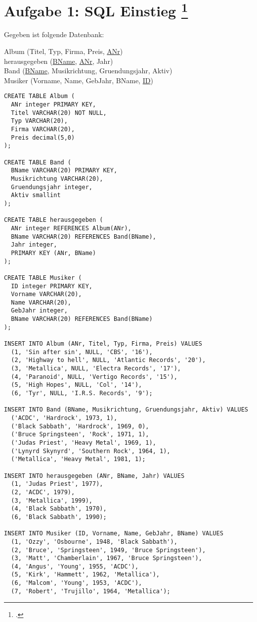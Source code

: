 \documentclass{bschlangaul-aufgabe}
\begin{document}

\section{Aufgabe 1: SQL Einstieg
\footcite{db:pu:2}}

Gegeben ist folgende Datenbank: \bigskip

{
\ttfamily
\noindent
Album (Titel, Typ, Firma, Preis, \underline{ANr})\\
\noindent
herausgegeben (\underline{BName}, \underline{ANr}, Jahr)\\
\noindent
Band (\underline{BName}, Musikrichtung, Gruendungsjahr, Aktiv)\\
\noindent
Musiker (Vorname, Name, GebJahr, BName, \underline{ID})\\
}

\begin{verbatim}
CREATE TABLE Album (
  ANr integer PRIMARY KEY,
  Titel VARCHAR(20) NOT NULL,
  Typ VARCHAR(20),
  Firma VARCHAR(20),
  Preis decimal(5,0)
);

CREATE TABLE Band (
  BName VARCHAR(20) PRIMARY KEY,
  Musikrichtung VARCHAR(20),
  Gruendungsjahr integer,
  Aktiv smallint
);

CREATE TABLE herausgegeben (
  ANr integer REFERENCES Album(ANr),
  BName VARCHAR(20) REFERENCES Band(BName),
  Jahr integer,
  PRIMARY KEY (ANr, BName)
);

CREATE TABLE Musiker (
  ID integer PRIMARY KEY,
  Vorname VARCHAR(20),
  Name VARCHAR(20),
  GebJahr integer,
  BName VARCHAR(20) REFERENCES Band(BName)
);

INSERT INTO Album (ANr, Titel, Typ, Firma, Preis) VALUES
  (1, 'Sin after sin', NULL, 'CBS', '16'),
  (2, 'Highway to hell', NULL, 'Atlantic Records', '20'),
  (3, 'Metallica', NULL, 'Electra Records', '17'),
  (4, 'Paranoid', NULL, 'Vertigo Records', '15'),
  (5, 'High Hopes', NULL, 'Col', '14'),
  (6, 'Tyr', NULL, 'I.R.S. Records', '9');

INSERT INTO Band (BName, Musikrichtung, Gruendungsjahr, Aktiv) VALUES
  ('ACDC', 'Hardrock', 1973, 1),
  ('Black Sabbath', 'Hardrock', 1969, 0),
  ('Bruce Springsteen', 'Rock', 1971, 1),
  ('Judas Priest', 'Heavy Metal', 1969, 1),
  ('Lynyrd Skynyrd', 'Southern Rock', 1964, 1),
  ('Metallica', 'Heavy Metal', 1981, 1);

INSERT INTO herausgegeben (ANr, BName, Jahr) VALUES
  (1, 'Judas Priest', 1977),
  (2, 'ACDC', 1979),
  (3, 'Metallica', 1999),
  (4, 'Black Sabbath', 1970),
  (6, 'Black Sabbath', 1990);

INSERT INTO Musiker (ID, Vorname, Name, GebJahr, BName) VALUES
  (1, 'Ozzy', 'Osbourne', 1948, 'Black Sabbath'),
  (2, 'Bruce', 'Springsteen', 1949, 'Bruce Springsteen'),
  (3, 'Matt', 'Chamberlain', 1967, 'Bruce Springsteen'),
  (4, 'Angus', 'Young', 1955, 'ACDC'),
  (5, 'Kirk', 'Hammett', 1962, 'Metallica'),
  (6, 'Malcom', 'Young', 1953, 'ACDC'),
  (7, 'Robert', 'Trujillo', 1964, 'Metallica');
\end{verbatim}
\end{document}
